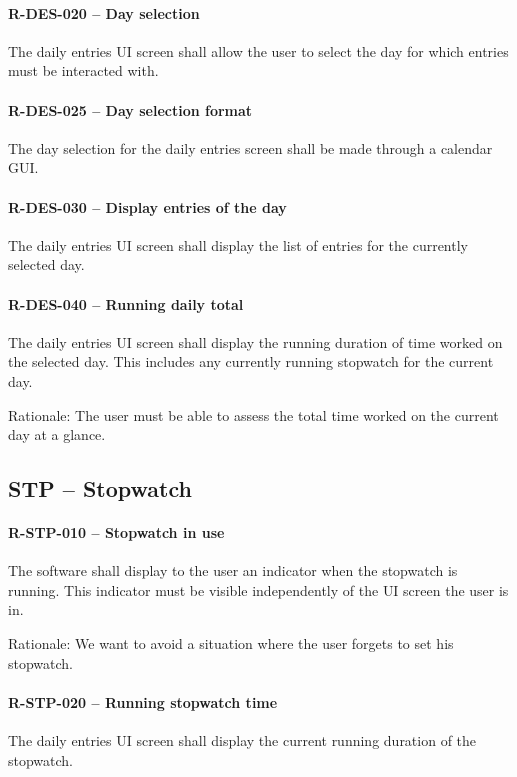 \paragraph{R-DES-020 -- Day selection}
The daily entries \gls{UI} screen shall allow the user to select the day for
which entries must be interacted with.

\paragraph{R-DES-025 -- Day selection format}
The day selection for the daily entries screen shall be made through a calendar
\gls{GUI}.

\paragraph{R-DES-030 -- Display entries of the day}
The daily entries \gls{UI} screen shall display the list of entries for the
currently selected day.

\paragraph{R-DES-040 -- Running daily total}
The daily entries \gls{UI} screen shall display the running duration of time
worked on the selected day. This includes any currently running stopwatch for
the current day.

Rationale: The user must be able to assess the total time worked on the current
day at a glance.

\subsection{STP -- Stopwatch}
\paragraph{R-STP-010 -- Stopwatch in use}
The software shall display to the user an indicator when the stopwatch is
running. This indicator must be visible independently of the \gls{UI} screen
the user is in.

Rationale: We want to avoid a situation where the user forgets to set his
stopwatch.

\paragraph{R-STP-020 -- Running stopwatch time}
The daily entries \gls{UI} screen shall display the current running duration
of the stopwatch.


